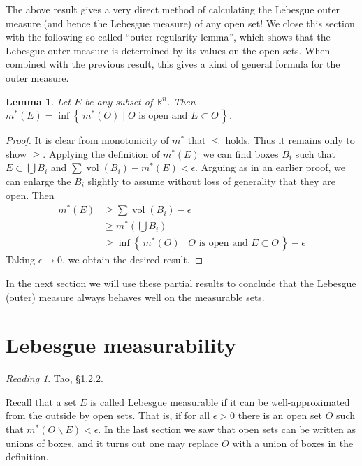 \documentclass[11pt,oneside]{amsbook}
\newcommand{\set}[1]{\left\{\,#1\,\right\}}
\renewcommand{\setminus}{\smallsetminus}
\newcommand{\RR}{{\mathbb R}}
\DeclareMathOperator{\vol}{vol}
\theoremstyle{definition}
\theoremstyle{plain}
\newtheorem{lem}[thm]{Lemma}
\theoremstyle{definition}
\theoremstyle{remark}
\newtheorem*{reading}{Reading}
\numberwithin{equation}{section}
\numberwithin{figure}{section}
\begin{document}
The above result gives a very direct method of calculating the Lebesgue outer measure (and hence the Lebesgue measure) of any open set! We close this section with the following so-called ``outer regularity lemma'', which shows that the Lebesgue outer measure is determined by its values on the open sets. When combined with the previous result, this gives a kind of general formula for the outer measure.

\begin{lem}
  Let $E$ be any subset of $\RR^n$. Then $m^*(E)=\inf\set{m^*(O)\mid\text{$O$ is open and }E\subset O}$.
\end{lem}

\begin{proof}
  It is clear from monotonicity of $m^*$ that $\leq$ holds. Thus it remains only to show $\geq$. Applying the definition of $m^*(E)$ we can find boxes $B_i$ such that $E\subset\bigcup B_i$ and $\sum\vol(B_i)-m^*(E)<\epsilon$. Arguing as in an earlier proof, we can enlarge the $B_i$ slightly to assume without loss of generality that they are open. Then
  \begin{align*}
    m^*(E)&\geq\sum\vol(B_i)-\epsilon\\
          &\geq m^*(\bigcup B_i)\\
          &\geq \inf\set{m^*(O)\mid\text{$O$ is open and }E\subset O}-\epsilon
  \end{align*}
  Taking $\epsilon\to0$, we obtain the desired result.
\end{proof}

In the next section we will use these partial results to conclude that the Lebesgue (outer) measure always behaves well on the measurable sets.


\section{Lebesgue measurability}

\begin{reading}
  Tao, \S 1.2.2.
\end{reading}

Recall that a set $E$ is called Lebesgue measurable if it can be well-approximated from the outside by open sets. That is, if for all $\epsilon>0$ there is an open set $O$ such that $m^*(O\setminus E)<\epsilon$. In the last section we saw that open sets can be written as unions of boxes, and it turns out one may replace $O$ with a union of boxes in the definition.
\end{document}
